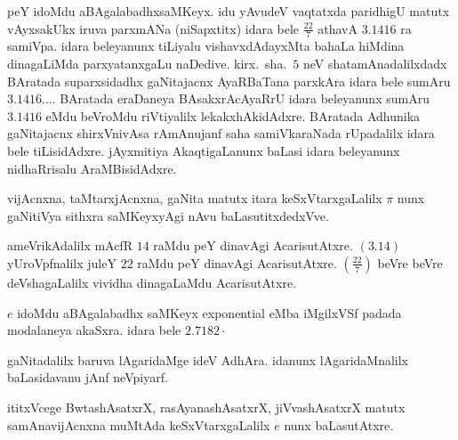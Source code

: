 peY idoMdu aBAgalabadhxsaMKeyx. idu yAvudeV vaqtatxda paridhigU matutx vAyxsakUkx iruva parxmANa (niSapxtitx) idara bele $\frac{22}{7}$ athavA $3.1416$ ra samiVpa. idara beleyanunx tiLiyalu vishavxdAdayxMta bahaLa hiMdina dinagaLiMda parxyatanxgaLu naDedive. kirx.~sha.\ $5$ neV shatamAnadalilxdadx BAratada suparxsidadhx gaNitajacnx AyaRBaTana parxkAra idara bele sumAru $3.1416\ldots$. BAratada eraDaneya BAsakxrAcAyaRrU idara beleyanunx sumAru $3.1416$ eMdu beVroMdu riVtiyalilx lekakxhAkidAdxre. BAratada Adhunika gaNitajacnx shirxVnivAsa rAmAnujanf saha samiVkaraNada rUpadalilx idara bele tiLisidAdxre. jAyxmitiya AkaqtigaLanunx baLasi idara beleyanunx nidhaRrisalu AraMBisidAdxre. 

vijAcnxna, taMtarxjAcnxna, gaNita matutx itara keSxVtarxgaLalilx $\pi$ nunx gaNitiVya sithxra saMKeyx\-yAgi nAvu baLasutitxdedxVve. 

ameVrikAdalilx mAcfR $14$ raMdu peY dinavAgi AcarisutAtxre. $(3.14)$ yUroVpfnalilx juleY $22$ raMdu peY dinavAgi AcarisutAtxre. $(\frac{22}{7})$ beVre beVre deVshagaLalilx vividha dinagaLaMdu AcarisutAtxre.

$e$ idoMdu aBAgalabadhx saMKeyx {\rm exponential} eMba iMgilxVSf padada modala\-neya akaSxra. idara bele $2.7182\cdot$

gaNitadalilx baruva lAgaridaMge ideV AdhAra. idanunx lAgaridaMnalilx baLasidavanu jAnf neVpiyarf.

ititxVcege BwtashAsatxrX, rasAyanashAsatxrX, jiVvashAsatxrX matutx samAnavijAcnxna muMtAda keSxVtarxgaLalilx $e$ nunx baLasutAtxre.


